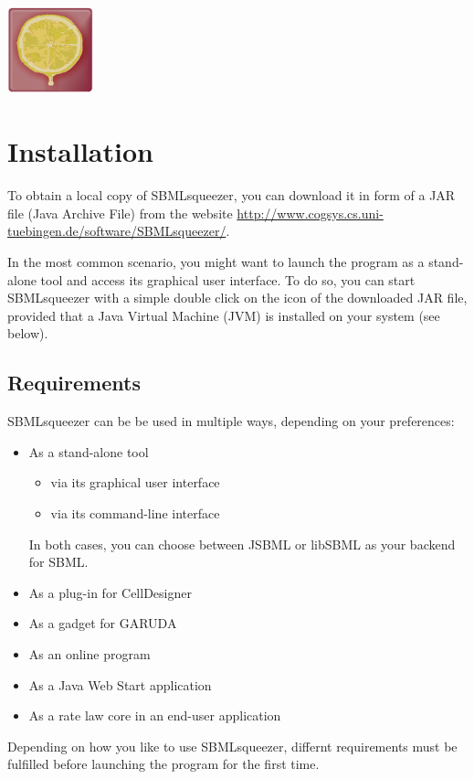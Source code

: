 \vspace{3cm}
\begin{center}
\includegraphics[width=2.5cm]{img/LOGO.png}
\end{center}


\chapter{Installation}

To obtain a local copy of SBMLsqueezer, you can download it in form of a JAR 
file (Java\texttrademark{} Archive File) from the website
\url{http://www.cogsys.cs.uni-tuebingen.de/software/SBMLsqueezer/}.

In the most common scenario, you might want to launch the program as a
stand-alone tool and access its graphical user interface. To do so, you can
start SBMLsqueezer with a simple double click on the icon of the downloaded
JAR file, provided that a Java  Virtual Machine (JVM) is installed on your
system (see below).

\section{Requirements}

SBMLsqueezer can be be used in multiple ways, depending on your preferences:
\begin{itemize}
  \item As a stand-alone tool
  \begin{itemize}
    \item via its graphical user interface
    \item via its command-line interface
  \end{itemize}
        In both cases, you can choose between JSBML or libSBML as your backend
        for SBML.
  \item As a plug-in for CellDesigner
  \item As a gadget for GARUDA
  \item As an online program
  \item As a Java\texttrademark{} Web Start application
  \item As a rate law core in an end-user application
\end{itemize}
Depending on how you like to use SBMLsqueezer, differnt requirements must be
fulfilled before launching the program for the first time.

